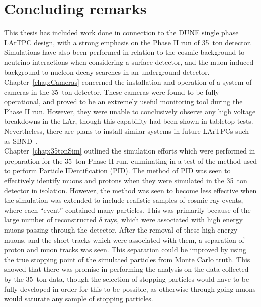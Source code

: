 \chapter{Concluding remarks} \label{chap:Conc} %

\graphicspath{{35tonData/Figs/PDF/}{35tonData/Figs/Raster/}{35tonData/Figs/Vector/}}

This thesis has included work done in connection to the DUNE single phase LArTPC design, with a strong emphasis on the Phase II run of 35~ton detector. Simulations have also been performed in relation to the cosmic background to neutrino interactions when considering a surface detector, and the muon-induced background to nucleon decay searches in an underground detector. \\

Chapter~\ref{chap:Cameras} concerned the installation and operation of a system of cameras in the 35~ton detector. These cameras were found to be fully operational, and proved to be an extremely useful monitoring tool during the Phase II run. However, they were unable to conclusively observe any high voltage breakdowns in the LAr, though this capability had been shown in tabletop tests. Nevertheless, there are plans to install similar systems in future LArTPCs such as SBND~\citep{SBNProposal}. \\

Chapter~\ref{chap:35tonSim} outlined the simulation efforts which were performed in preparation for the 35~ton Phase II run, culminating in a test of the method used to perform Particle IDentification (PID). The method of PID was seen to effectively identify muons and protons when they were simulated in the 35~ton detector in isolation. However, the method was seen to become less effective when the simulation was extended to include realistic samples of cosmic-ray events, where each ``event'' contained many particles. This was primarily because of the large number of reconstructed $\delta$ rays, which were associated with high energy muons passing through the detector. After the removal of these high energy muons, and the short tracks which were associated with them, a separation of proton and muon tracks was seen. This separation could be improved by using the true stopping point of the simulated particles from Monte Carlo truth. This showed that there was promise in performing the analysis on the data collected by the 35~ton data, though the selection of stopping particles would have to be fully developed in order for this to be possible, as otherwise through going muons would saturate any sample of stopping particles. \\

